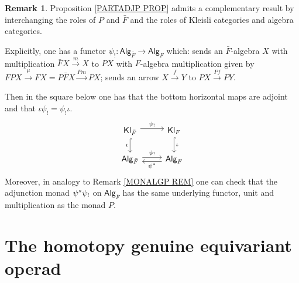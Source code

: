 \documentclass[a4paper,10pt
,draft
]{article}%
\numberwithin{equation}{section}
\numberwithin{figure}{section}
\theoremstyle{definition} %
\newtheorem{remark}[equation]{Remark}%
\newcommand{\Alg}{\mathsf{Alg}}
\newcommand{\1}{\ensuremath{\mathbbm 1}}%
\begin{document}


\begin{remark}
Proposition \ref{PARTADJP PROP} 
admits a complementary result by interchanging the roles of $P$ and $\bar{F}$ and the roles of Kleisli categories and algebra categories.

Explicitly, one has a functor
$\psi_!\colon \Alg_{\bar{F}} \to \Alg_F$
which: sends an $\bar{F}$-algebra $X$
with multiplication $\bar{F} X \xrightarrow{m} X$
to $PX$ with $F$-algebra multiplication given by
$FPX \xrightarrow{\mu} FX=P\bar{F}X \xrightarrow{Pm} PX$;
sends an arrow
$X \xrightarrow{f} Y$
to $PX \xrightarrow{Pf} PY$.

Then in the square below one has that the bottom horizontal maps are adjoint and that
$\iota \psi_! = \psi_!\iota$.
\begin{equation}\label{PARTADJBARF EQ}
\begin{tikzcd}
	\mathsf{Kl}_{\bar{F}} 
	\ar[shift left=0.25em]{r}{\psi_!} 
	\ar[hookrightarrow]{d}[swap]{\iota}
&
	\mathsf{Kl}_{F} 
	\ar[hookrightarrow]{d}{\iota}
\\
	\mathsf{Alg}_{\bar{F}} 
	\ar[shift left=0.25em]{r}{\psi_!} 
&
	\mathsf{Alg}_{F}  
	\ar[shift left=0.25em]{l}{\psi^{\**}}
\end{tikzcd}
\end{equation}
Moreover, in analogy to Remark \ref{MONALGP REM}
one can check that the adjunction monad
$\psi^{\**} \psi_!$ on $\Alg_{\bar{F}}$ has the same underlying functor, unit and multiplication as the monad $P$.
\end{remark}







\section{The homotopy genuine equivariant operad}
\label{HO_SEC}
\end{document}
